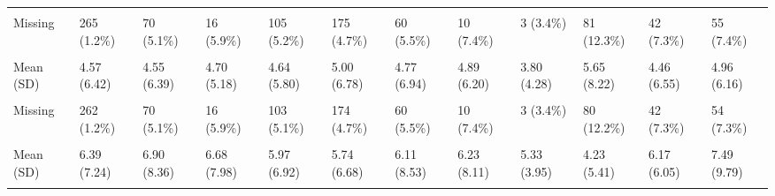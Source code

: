 \documentclass[
  single column]{article}
\begin{document}
\begin{landscape}
\begin{longtable}[t]{llllllllllll}
\cellcolor{gray!10}{Median [Min, Max]} & \cellcolor{gray!10}{0 [0, 168]} & \cellcolor{gray!10}{0 [0, 168]} & \cellcolor{gray!10}{0 [0, 168]} & \cellcolor{gray!10}{0 [0, 168]} & \cellcolor{gray!10}{0 [0, 168]} & \cellcolor{gray!10}{0 [0, 168]} & \cellcolor{gray!10}{0 [0, 168]} & \cellcolor{gray!10}{0 [0, 150]} & \cellcolor{gray!10}{0 [0, 168]} & \cellcolor{gray!10}{0 [0, 168]} & \cellcolor{gray!10}{0 [0, 168]}\\
Missing & 265 (1.2\%) & 70 (5.1\%) & 16 (5.9\%) & 105 (5.2\%) & 175 (4.7\%) & 60 (5.5\%) & 10 (7.4\%) & 3 (3.4\%) & 81 (12.3\%) & 42 (7.3\%) & 55 (7.4\%)\\
\cellcolor{gray!10}{hours\_commute} & \cellcolor{gray!10}{} & \cellcolor{gray!10}{} & \cellcolor{gray!10}{} & \cellcolor{gray!10}{} & \cellcolor{gray!10}{} & \cellcolor{gray!10}{} & \cellcolor{gray!10}{} & \cellcolor{gray!10}{} & \cellcolor{gray!10}{} & \cellcolor{gray!10}{} & \cellcolor{gray!10}{}\\
\addlinespace
Mean (SD) & 4.57 (6.42) & 4.55 (6.39) & 4.70 (5.18) & 4.64 (5.80) & 5.00 (6.78) & 4.77 (6.94) & 4.89 (6.20) & 3.80 (4.28) & 5.65 (8.22) & 4.46 (6.55) & 4.96 (6.16)\\
\cellcolor{gray!10}{Median [Min, Max]} & \cellcolor{gray!10}{3.00 [0, 160]} & \cellcolor{gray!10}{3.00 [0, 100]} & \cellcolor{gray!10}{3.00 [0, 40.0]} & \cellcolor{gray!10}{3.00 [0, 100]} & \cellcolor{gray!10}{3.50 [0, 100]} & \cellcolor{gray!10}{3.00 [0, 100]} & \cellcolor{gray!10}{3.75 [0, 50.0]} & \cellcolor{gray!10}{3.00 [0, 25.0]} & \cellcolor{gray!10}{3.50 [0, 100]} & \cellcolor{gray!10}{3.00 [0, 80.0]} & \cellcolor{gray!10}{3.00 [0, 60.0]}\\
Missing & 262 (1.2\%) & 70 (5.1\%) & 16 (5.9\%) & 103 (5.1\%) & 174 (4.7\%) & 60 (5.5\%) & 10 (7.4\%) & 3 (3.4\%) & 80 (12.2\%) & 42 (7.3\%) & 54 (7.3\%)\\
\cellcolor{gray!10}{hours\_exercise} & \cellcolor{gray!10}{} & \cellcolor{gray!10}{} & \cellcolor{gray!10}{} & \cellcolor{gray!10}{} & \cellcolor{gray!10}{} & \cellcolor{gray!10}{} & \cellcolor{gray!10}{} & \cellcolor{gray!10}{} & \cellcolor{gray!10}{} & \cellcolor{gray!10}{} & \cellcolor{gray!10}{}\\
Mean (SD) & 6.39 (7.24) & 6.90 (8.36) & 6.68 (7.98) & 5.97 (6.92) & 5.74 (6.68) & 6.11 (8.53) & 6.23 (8.11) & 5.33 (3.95) & 4.23 (5.41) & 6.17 (6.05) & 7.49 (9.79)\\
\addlinespace
\cellcolor{gray!10}{Median [Min, Max]} & \cellcolor{gray!10}{5.00 [0, 80.0]} & \cellcolor{gray!10}{5.00 [0, 80.0]} & \cellcolor{gray!10}{5.00 [0, 80.0]} & \cellcolor{gray!10}{5.00 [0, 80.0]} & \cellcolor{gray!10}{4.00 [0, 80.0]} & \cellcolor{gray!10}{4.00 [0, 80.0]} & \cellcolor{gray!10}{5.00 [0, 80.0]} & \cellcolor{gray!10}{5.00 [0, 16.0]} & \cellcolor{gray!10}{3.00 [0, 50.0]} & \cellcolor{gray!10}{5.00 [0, 36.0]} & \cellcolor{gray!10}{5.00 [0, 80.0]}\\

\end{longtable}
\end{landscape}
\end{document}
